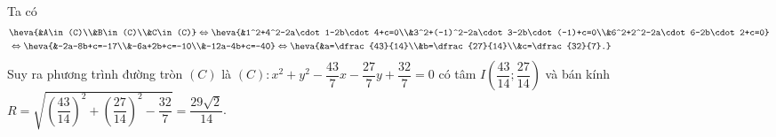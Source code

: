 \begin{bt}
{\begin{enumerate}
Ta có
\begin{eqnarray*}
	&\heva{&A\in (C)\\&B\in (C)\\&C\in (C)}\Leftrightarrow \heva{&1^2+4^2-2a\cdot 1-2b\cdot 4+c=0\\&3^2+(-1)^2-2a\cdot 3-2b\cdot (-1)+c=0\\&6^2+2^2-2a\cdot 6-2b\cdot 2+c=0}\\
	&\Leftrightarrow \heva{&-2a-8b+c=-17\\&-6a+2b+c=-10\\&-12a-4b+c=-40}\Leftrightarrow \heva{&a=\dfrac{43}{14}\\&b=\dfrac{27}{14}\\&c=\dfrac{32}{7}.}
\end{eqnarray*}
Suy ra phương trình đường tròn $(C)$ là $(C)\colon x^2+y^2-\dfrac{43}{7}x-\dfrac{27}{7}y+\dfrac{32}{7}=0$ có tâm $I\left(\dfrac{43}{14};\dfrac{27}{14}\right)$ và bán kính $R=\sqrt{\left(\dfrac{43}{14}\right)^2+\left(\dfrac{27}{14}\right)^2-\dfrac{32}{7}}=\dfrac{29\sqrt{2}}{14}$.
\end{enumerate}
}
\end{bt}
